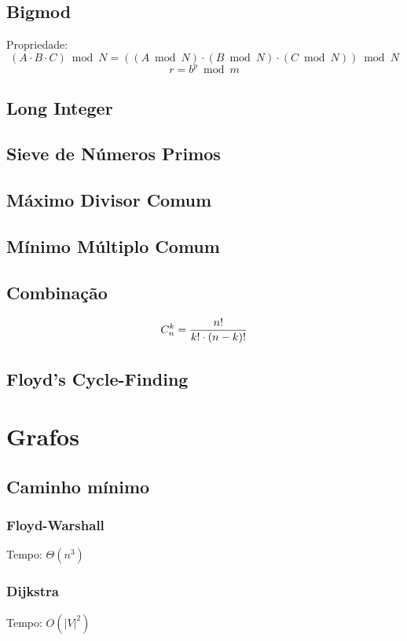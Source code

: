 \documentclass[12pt,a4paper]{article}
\begin{document}
		\subsection{Bigmod}
			Propriedade:
			\[ (A \cdot B \cdot C) \bmod N = ((A \bmod N) \cdot (B \bmod N) \cdot (C \bmod N)) \bmod N \]
			\[ r = b^p \bmod m \]
			
		\subsection{Long Integer}
			
		\subsection{Sieve de Números Primos}
			
		\subsection{Máximo Divisor Comum}
			
		\subsection{Mínimo Múltiplo Comum}
			
		\subsection{Combinação}
			\[ C_n^k = {n! \over {k! \cdot (n - k)!}} \]
			
		\subsection{Floyd's Cycle-Finding}
			

	\section{Grafos}
		\subsection{Caminho mínimo}
			\subsubsection{Floyd-Warshall}
				Tempo: \( \Theta(n^3)\)
				
			\subsubsection{Dijkstra}
				Tempo: \( O(|V|^2) \)
				
\end{document}
